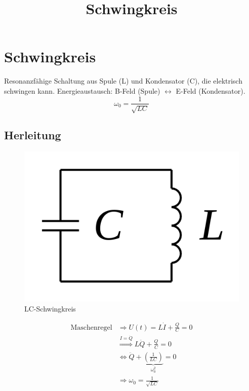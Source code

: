 \documentclass[10pt,a4paper]{article}
\title{Schwingkreis}
\begin{document}
\section*{Schwingkreis}
Resonanzfähige Schaltung aus Spule (L) und Kondensator (C), die elektrisch schwingen kann.
Energieaustausch: B-Feld (Spule) $\leftrightarrow$ E-Feld (Kondensator).
\begin{equation}
\label{Thomson Schwingungsgleichung}
\omega_0=\frac{1}{\sqrt{LC}}
\end{equation}
\subsection{Herleitung}
\begin{figure}[hbtp]
\caption{LC-Schwingkreis}
\centering
\includegraphics[scale=0.25]{500px-Schwingkreis.png}
\end{figure}
\begin{align*}
\text{Maschenregel} &\Rightarrow U(t)=L\dot{I}+\frac{Q}{C}=0 \\
&\stackrel{I=\dot{Q}}{\Rightarrow} L\ddot{Q}+\frac{Q}{C}=0 \\
&\Leftrightarrow \ddot{Q}+\underbrace{(\frac{1}{LC})}_{\omega_0^2}=0 \\
&\Rightarrow \omega_0=\frac{1}{\sqrt{LC}} 
\end{align*}
\end{document}

